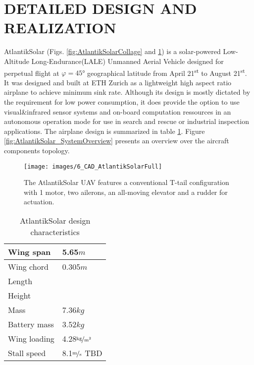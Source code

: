 \section{DETAILED DESIGN AND REALIZATION}

AtlantikSolar (Figs. \ref{fig:AtlantikSolarCollage} and \ref{fig:CAD_AtlantikSolarFull}) is a solar-powered Low-Altitude Long-Endurance(LALE) Unmanned Aerial Vehicle designed for perpetual flight at $\varphi=45°$ geographical latitude from April 21\textsuperscript{st} to August 21\textsuperscript{st}. It was designed and built at ETH Zurich as a lightweight high aspect ratio airplane to achieve minimum sink rate. Although its design is mostly dictated by the requirement for low power consumption, it does provide the option to use visual\&infrared sensor systems and on-board computation ressources in an autonomous operation mode for use in search and rescue or industrial inspection applications. The airplane design is summarized in table \ref{tab:DetailedDesignParameters}. Figure \ref{fig:AtlantikSolar_SystemOverview} presents an overview over the aircraft components topology.

\begin{figure}[tb]
    \centering
    \texttt{[image: images/6\_CAD\_AtlantikSolarFull]}
    \caption{The AtlantikSolar UAV features a conventional T-tail configuration with 1 motor, two ailerons, an all-moving elevator and a rudder for actuation.}
    \label{fig:CAD_AtlantikSolarFull}
\end{figure}

\begin{table}
\label{tab:DetailedDesignParameters}
\caption{AtlantikSolar design characteristics}
\begin{center}
\begin{tabular}{l l}
Wing span & 5.65$\unit{m}$\\
\hline Wing chord& 0.305$\unit{m}$\\
\hline Length& \\
\hline Height&\\
\hline Mass& 7.36$\unit{kg}$\\
\hline Battery mass& 3.52$\unit{kg}$\\
\hline Wing loading&4.28$\unitfrac{kg}{m^2}$\\
\hline Stall speed& 8.1$\unitfrac{m}{s}$ TBD\\
\end{tabular}
\end{center}
\end{table}

